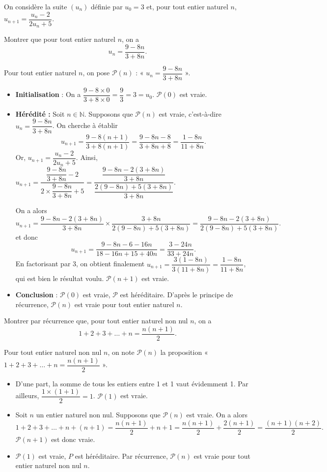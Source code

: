 \documentclass[11pt,fleqn]{book} %
\begin{document}
\begin{exercise}[topic=rec01]On considère la suite \((u_n)\) définie par \(u_0=3\) et, pour tout entier naturel \(n\), \(u_{n+1}=\dfrac{u_n-2}{2u_n+5}\).

Montrer que pour tout entier naturel \(n\), on a \[u_n = \dfrac{9-8n}{3+8n}.\]\end{exercise}
\begin{solution}Pour tout entier naturel \(n\), on pose \(\mathcal{P}(n)\) : « \(u_n =\dfrac{9-8n}{3+8n}\) ».
\begin{itemize} \item \textbf{Initialisation} : On a \(\dfrac{9-8 \times 0}{3+8 \times 0}=\dfrac{9}{3}=3=u_0\). \(\mathcal{P}(0)\) est vraie.
\item\textbf{Hérédité :} Soit \(n\in\mathbb{N}\). Supposons que \(\mathcal{P}(n)\) est vraie, c'est-à-dire \(u_n =\dfrac{9-8n}{3+8n}\). On cherche à établir
\[u_{n+1}=\dfrac{9-8(n+1)}{3+8(n+1)}=\dfrac{9-8n-8}{3+8n+8}=\dfrac{1-8n}{11+8n}.\]
Or, \(u_{n+1}=\dfrac{u_n-2}{2u_n+5}\). Ainsi, $u_{n+1}=\dfrac{\dfrac{9-8n}{3+8n}-2}{2 \times \dfrac{9-8n}{3+8n} +5} = \dfrac{\dfrac{9-8n-2(3+8n)}{3+8n}}{\dfrac{2(9-8n)+5(3+8n)}{3+8n}}$.

On a alors
\[u_{n+1}=\dfrac{9-8n-2(3+8n)}{3+8n} \times \dfrac{3+8n}{2(9-8n)+5(3+8n)}=\dfrac{9-8n-2(3+8n)}{2(9-8n)+5(3+8n)}.\]
et donc
\[u_{n+1}=\dfrac{9-8n-6-16n}{18-16n+15+40n}=\dfrac{3-24n}{33+24n}.\]
En factorisant par 3, on obtient finalement $u_{n+1}=\dfrac{3(1-8n)}{3(11+8n)}=\dfrac{1-8n}{11+8n}$, qui est bien le résultat voulu. \(\mathcal{P}(n+1)\) est vraie.
\item \textbf{Conclusion} :  \(\mathcal{P}(0)\) est vraie, \(\mathcal{P}\) est héréditaire. D'après le principe de récurrence, \(\mathcal{P}(n)\) est vraie pour tout entier naturel \(n\).\end{itemize}\end{solution}


\begin{exercise}[topic=rec01] Montrer par récurrence que, pour tout entier naturel non nul $n$, on a \[1+2+3+\ldots + n=\dfrac{n(n+1)}{2}.\] \end{exercise}
\begin{solution}Pour tout entier naturel non nul $n$, on note $\mathcal{P}(n)$ la proposition  « $1+2+3+\ldots + n=\dfrac{n(n+1)}{2}$ ».
\begin{itemize}
\item D'une part, la somme de tous les entiers entre 1 et 1 vaut évidemment 1. Par ailleurs, $\dfrac{1\times (1+1)}{2}=1$. $\mathcal{P}(1)$ est vraie.
\item Soit $n$ un entier naturel non nul. Supposons que $\mathcal{P}(n)$ est vraie. On a alors
\[1+2+3+\ldots +n+(n+1) = \dfrac{n(n+1)}{2}+n+1=\dfrac{n(n+1)}{2}+\dfrac{2(n+1)}{2}=\dfrac{(n+1)(n+2)}{2}.\]
$\mathcal{P}(n+1)$ est donc vraie.
\item $\mathcal{P}(1)$ est vraie, $P$ est héréditaire. Par récurrence, $\mathcal{P}(n)$ est vraie pour tout entier naturel non nul $n$.\end{itemize}\end{solution}
\end{document}
